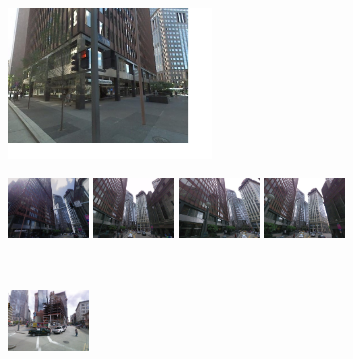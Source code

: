 \documentclass[10pt,twocolumn,letterpaper]{article}
\begin{document}
         \begin{figure}[t!]
            \begin{minipage}{0.34\linewidth}
               \centering
               \vspace{5mm}
               \includegraphics[height=40mm]{imgs/ex1/query.jpg}
            \end{minipage}
            \begin{minipage}{0.75\linewidth}
               \begin{minipage}{\linewidth} 
                   \colorbox{myGreen}{\includegraphics[height=16mm]{imgs/ex1/FVsvm1.jpg}}
                   \colorbox{myGreen}{\includegraphics[height=16mm]{imgs/ex1/FVsvm2.jpg}}
                   \colorbox{myGreen}{\includegraphics[height=16mm]{imgs/ex1/FVsvm3.jpg}}
                   \colorbox{myGreen}{\includegraphics[height=16mm]{imgs/ex1/FVsvm4.jpg}}
               \end{minipage}
               \\
               \begin{minipage}{\linewidth}
                   \colorbox{myRed}{\includegraphics[height=16mm]{imgs/ex1/FV1.jpg}}

\end{minipage}
\end{minipage}
\end{figure}
\end{document}
